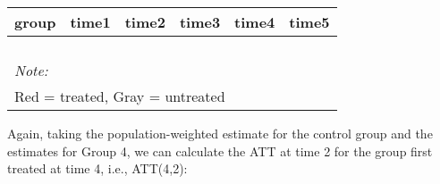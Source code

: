 \documentclass[
]{article}
\begin{document}
\begin{table}
\centering
\begin{tabular}[t]{>{}r|>{}r|>{}r|>{}r|>{}r|>{}r}
\hline
group & time1 & time2 & time3 & time4 & time5\\
\hline
\cellcolor{white}{2} & \cellcolor{white}{\textcolor{black}{0.631}} & \cellcolor{white}{\textcolor{black}{0.711}} & \cellcolor{white}{0.814} & \cellcolor{white}{0.846} & \cellcolor{white}{0.826}\\
\hline
\cellcolor{white}{3} & \cellcolor{lightgray}{\textcolor{black}{0.678}} & \cellcolor{lightgray}{\textcolor{black}{0.770}} & \cellcolor{white}{0.664} & \cellcolor{white}{0.800} & \cellcolor{white}{0.784}\\
\hline
\cellcolor{white}{4} & \cellcolor{red}{\textcolor{black}{0.778}} & \cellcolor{red}{\textcolor{black}{0.807}} & \cellcolor{white}{0.673} & \cellcolor{white}{0.750} & \cellcolor{white}{0.868}\\
\hline
\cellcolor{white}{5} & \cellcolor{lightgray}{\textcolor{black}{0.854}} & \cellcolor{lightgray}{\textcolor{black}{0.939}} & \cellcolor{white}{0.854} & \cellcolor{white}{0.800} & \cellcolor{white}{0.855}\\
\hline
\multicolumn{6}{l}{\rule{0pt}{1em}\textit{Note: }}\\
\multicolumn{6}{l}{\rule{0pt}{1em}Red = treated, Gray = untreated}\\
\end{tabular}
\end{table}

Again, taking the population-weighted estimate for the control group and
the estimates for Group 4, we can calculate the ATT at time 2 for the
group first treated at time 4, i.e., ATT(4,2):
\end{document}
